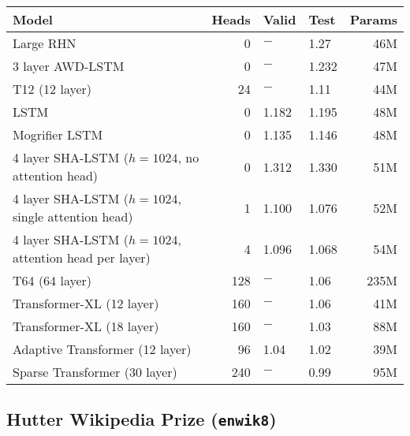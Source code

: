 \documentclass{article}
\newcommand{\enwik}{\texttt{enwik8}\xspace}
\begin{document}
\begin{table*}
\small
\begin{center}
 \begin{tabular}{@{} lrllr @{}}
 \toprule[1.5pt]
 Model & Heads & Valid & Test & Params \\
 \midrule
 Large RHN \cite{Zilly2016}& 0 & $-$ & 1.27 & 46M \\
 3 layer AWD-LSTM \cite{merity2018analysis} & 0 & $-$ & 1.232 & 47M \\
T12 (12 layer) \cite{al2019character} & 24 & $-$ & 1.11 & 44M \\
 LSTM \cite{melis2019mogrifier} & 0 & 1.182 & 1.195 & 48M \\
 Mogrifier LSTM \cite{melis2019mogrifier} & 0 & 1.135 & 1.146 & 48M \\
 \midrule
 4 layer SHA-LSTM ($h=1024$, no attention head) & 0 & 1.312 & 1.330 & 51M \\
 4 layer SHA-LSTM ($h=1024$, single attention head) & 1 & 1.100 & 1.076 & 52M \\
 4 layer SHA-LSTM ($h=1024$, attention head per layer) & 4 & 1.096 & 1.068 & 54M \\
\midrule
 T64 (64 layer) \cite{al2019character} & 128 & $-$ & 1.06 & 235M \\
 Transformer-XL (12 layer) \cite{dai2019transformer} & 160 & $-$ & 1.06 & 41M \\
 Transformer-XL (18 layer) \cite{dai2019transformer} & 160 & $-$ & 1.03 & 88M \\
 Adaptive Transformer (12 layer) \cite{sukhbaatar2019adaptive} & 96 & 1.04 & 1.02 & 39M \\
 Sparse Transformer (30 layer) \cite{child2019generating} & 240 & $-$ & 0.99 & 95M \\
\bottomrule
\end{tabular}
\end{center}
\caption{
Bits Per Character (BPC) on \enwik.
The single attention SHA-LSTM has an attention head on the second last layer and had batch size 16 due to lower memory use.
Directly comparing the head count for LSTM models and Transformer models obviously doesn't make sense but neither does comparing zero-headed LSTMs against bajillion headed models and then declaring an entire species dead.
The hyper-parameters for the fully headed SHA-LSTM were used for the other SHA-LSTM experiments with zero tuning.
}
\label{table:enwik8}
\end{table*}

\subsection{Hutter Wikipedia Prize (\enwik)}
\end{document}
